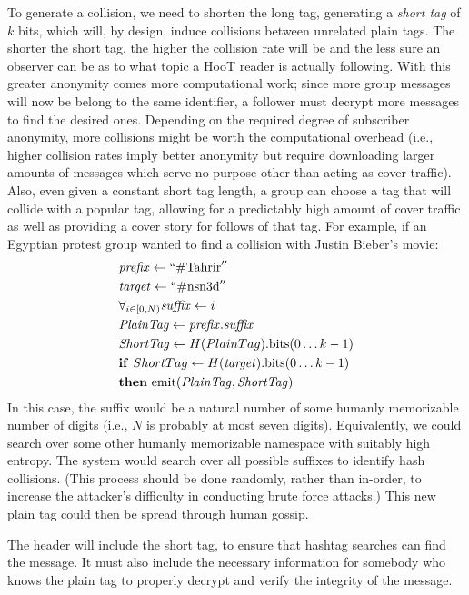 To generate a collision, we need to shorten the long tag, generating a \textit{short tag} of $k$ bits, which will, by design, induce collisions between unrelated plain tags. The shorter the short tag, the higher the collision rate will be and the less sure an observer can be as to what topic a HooT reader is actually following. With this greater anonymity comes more computational work; since more group messages will now be belong to the same identifier, a follower must decrypt more messages to find the desired ones. Depending on the required degree of subscriber anonymity, more collisions might be worth the computational overhead (i.e., higher collision rates imply better anonymity but require downloading larger amounts of messages which serve no purpose other than acting as cover traffic). Also, even given a constant short tag length, a group can choose a tag that will collide with a popular tag, allowing for a predictably high amount of cover traffic as well as providing a cover story for follows of that tag. For example, if an Egyptian protest group wanted to find a collision with Justin Bieber's movie:
%
\begin{align*}
& \mathit{prefix} \leftarrow  ``\mathrm{\#Tahrir}'' \\
& \mathit{target} \leftarrow ``\mathrm{\#nsn3d}'' \\
& \forall_{i \in [0, N)}  \mathit{suffix} \leftarrow i \\
& \mathit{PlainTag} \leftarrow  \mathit{prefix}.\mathit{suffix} \\
& \mathit{ShortTag} \leftarrow H({\mathit PlainTag}).\mathrm{bits}(0 \ldots k-1) \\
& \mathbf{if}\ {\mathit ShortTag} \leftarrow H(\mathit{target}).\mathrm{bits}(0 \ldots k-1)\\
& \mathbf{then}\ \mathrm{emit} (\mathit{PlainTag} , {\mathit{ShortTag}})
\end{align*}
%
In this case, the suffix would be a natural number of some humanly memorizable number of digits (i.e., $N$ is probably at most seven digits). Equivalently, we could search over some other humanly memorizable namespace with suitably high entropy. The system would search over all possible suffixes to identify hash collisions. (This process should be done randomly, rather than in-order, to increase the attacker's difficulty in conducting brute force attacks.) This new plain tag could then be spread through human gossip.

The header will include the short tag, to ensure that hashtag searches can find the message. It must also include the necessary information for somebody who knows the plain tag to properly decrypt and verify the integrity of the message. 

